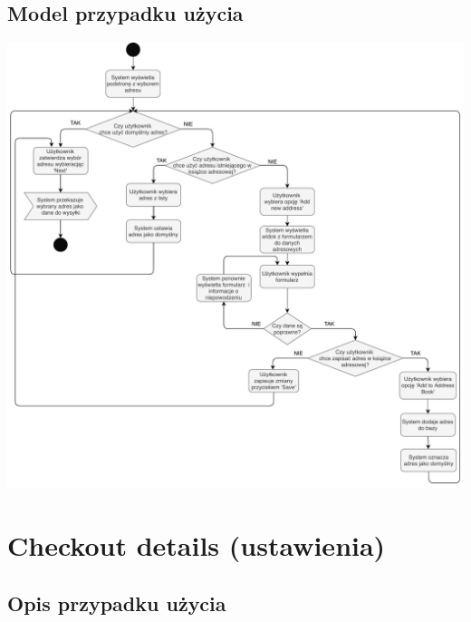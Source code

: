 \documentclass[12pt]{report}
\begin{document}
		\subsection{Model przypadku użycia}
			\begin{center}
				\includegraphics[width=450pt]{wysylka.pdf}
			\end{center}
			\newpage
	
	\section{Checkout details (ustawienia)}
	
		\subsection{Opis przypadku użycia}
		
\end{document}
